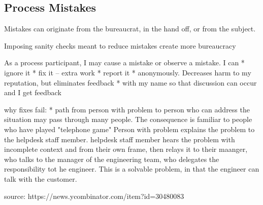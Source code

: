 \subsection{Process Mistakes}

Mistakes can originate from the bureaucrat, in the hand off, or from the subject.

Imposing sanity checks meant to reduce mistakes create more bureaucracy 


As a process participant, I may cause a mistake or observe a mistake. I can 
* ignore it
* fix it -- extra work
* report it
    * anonymously. Decreases harm to my reputation, but eliminates feedback
    * with my name so that discussion can occur and I get feedback
    
    
    

why fixes fail:
* path from person with problem to person who can address the situation may pass through many people. 
The consequence is familiar to people who have played "telephone game"
Person with problem explains the problem to the helpdesk staff member. helpdesk staff member hears the problem with incomplete context and from their own frame, then relays it to their maanger, who talks to the manager of the engineering team, who delegates the responsibility tot he engineer. 
This is a solvable problem, in that the engineer can talk with the customer. 

source: 
https://news.ycombinator.com/item?id=30480083